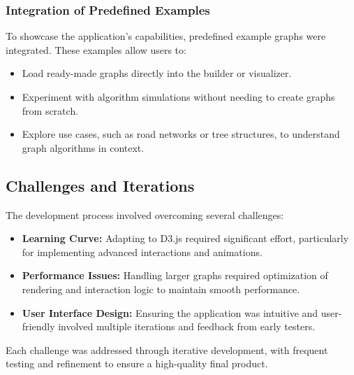\subsubsection{Integration of Predefined Examples}
To showcase the application’s capabilities, predefined example graphs were integrated. These examples allow users to:
\begin{itemize}
    \item Load ready-made graphs directly into the builder or visualizer.
    \item Experiment with algorithm simulations without needing to create graphs from scratch.
    \item Explore use cases, such as road networks or tree structures, to understand graph algorithms in context.
\end{itemize}

\subsection{Challenges and Iterations}
The development process involved overcoming several challenges:
\begin{itemize}
    \item \textbf{Learning Curve:} Adapting to D3.js required significant effort, particularly for implementing advanced interactions and animations.
    \item \textbf{Performance Issues:} Handling larger graphs required optimization of rendering and interaction logic to maintain smooth performance.
    \item \textbf{User Interface Design:} Ensuring the application was intuitive and user-friendly involved multiple iterations and feedback from early testers.
\end{itemize}
Each challenge was addressed through iterative development, with frequent testing and refinement to ensure a high-quality final product.
